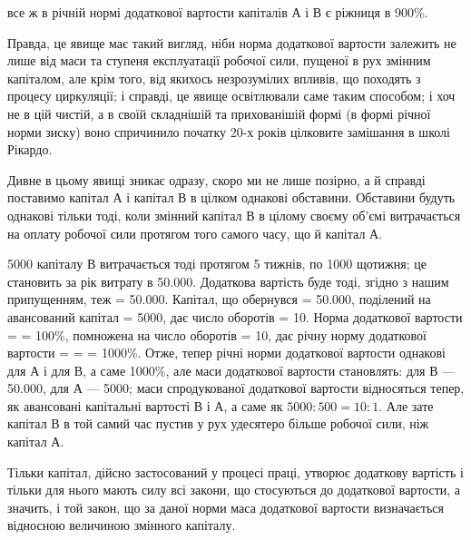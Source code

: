 \parcont{}  %
все ж в річній нормі додаткової вартости капіталів А і В є ріжниця в
900\%.

Правда, це явище має такий вигляд, ніби норма додаткової вартости
залежить не лише від маси та ступеня експлуатації робочої сили,
пущеної в рух змінним капіталом, але крім того, від якихось незрозумілих
впливів, що походять з процесу циркуляції; і справді, це явище
освітлювали саме таким способом; і хоч не в цій чистій, а в своїй складнішій
та прихованішій формі (в формі річної норми зиску) воно спричинило
початку 20-х років цілковите замішання в школі Рікардо.

Дивне в цьому явищі зникає одразу, скоро ми не лише позірно, а
й справді поставимо капітал А і капітал В в цілком однакові обставини.
Обставини будуть однакові тільки тоді, коли змінний капітал В в цілому
своєму об’ємі витрачається на оплату робочої сили протягом того
самого часу, що й капітал А.

5000 капіталу В витрачається тоді протягом 5 тижнів, по
1000 щотижня; це становить за рік витрату в \num{50.000}.
Додаткова вартість буде тоді, згідно з нашим припущенням, теж = \num{50.000}. Капітал, що обернувся = \num{50.000}, поділений на авансований
капітал = 5000, дає число оборотів = 10. Норма додаткової
вартости =  = 100\%, помножена на число оборотів = 10, дає річну норму додаткової
вартости =  =  = 1000\%. Отже, тепер річні норми додаткової вартости однакові для
А і для В, а саме
1000\%, але маси додаткової вартости становлять: для В — \num{50.000},
для А — 5000; маси спродукованої додаткової вартости відносяться
тепер, як авансовані капітальні вартості В і А, а саме як
$5000 : 500 = 10 : 1$. Але зате капітал В в той самий час пустив у рух удесятеро
більше робочої сили, ніж капітал А.

Тільки капітал, дійсно застосований у процесі праці, утворює додаткову
вартість і тільки для нього мають силу всі закони, що стосуються
до додаткової вартости, а значить, і той закон, що за даної норми маса
додаткової вартости визначається відносною величиною змінного капіталу.

